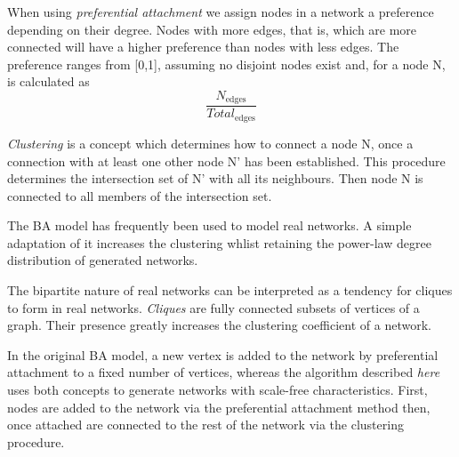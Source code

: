 \documentclass[a4paper,11pt,titlepage]{article}
\begin{document}
When using \emph{preferential attachment} we assign nodes in a network a preference 
depending on their degree. Nodes with more edges, that is, which are more connected 
will have a higher preference than nodes with less edges. The preference ranges 
from [0,1], assuming no disjoint nodes exist and, for a node N, is calculated as
\[
\frac{N_\mathrm{edges}}{Total_\mathrm{edges}}
\]

\emph{Clustering} is a concept which determines how to connect a node N, once a 
connection with at least one other node N' has been established. This procedure 
determines the intersection set of N' with all its neighbours. Then node N is 
connected to all members of the intersection set.

The BA model has frequently been used to model real networks. A simple adaptation
of it increases the clustering whlist retaining the power-law degree distribution 
of generated networks.

The bipartite nature of real networks can be interpreted as a tendency for cliques
to form in real networks. \emph{Cliques} are fully connected subsets of vertices of a 
graph. Their presence greatly increases the clustering coefficient of a network.

In the original BA model, a new vertex is added to the network by preferential
attachment to a fixed number of vertices, whereas the algorithm described \emph{here} uses both concepts to generate networks with scale-free characteristics. First, nodes are added to the network via the preferential attachment method then, once attached are connected to the rest of the network via the clustering procedure.
\end{document}
